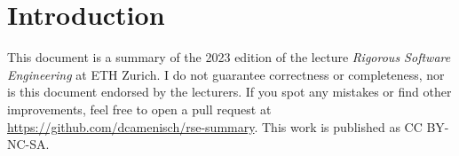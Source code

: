 \section{Introduction}

This document is a summary of the 2023 edition of the lecture \textit{Rigorous Software Engineering} at ETH Zurich. I do not guarantee correctness or completeness, nor is this document endorsed by the lecturers. If you spot any mistakes or find other improvements, feel free to open a pull request at \url{https://github.com/dcamenisch/rse-summary}. This work is published as CC BY-NC-SA.
\begin{center}
	\ccbyncsa
\end{center}